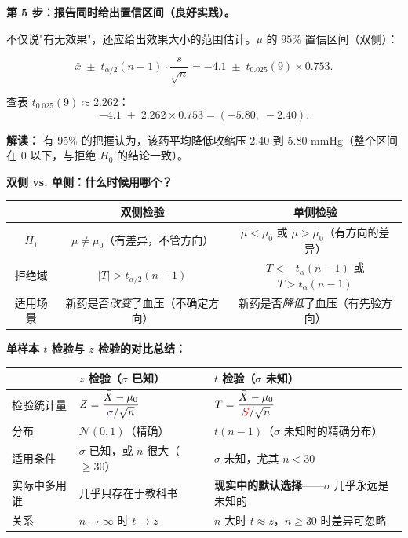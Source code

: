 \textbf{第 5 步：报告同时给出置信区间（良好实践）。}

不仅说"有无效果"，还应给出效果大小的范围估计。$\mu$ 的 $95\%$ 置信区间（双侧）：

\begin{equation}
    \bar{x} \;\pm\; t_{\alpha/2}(n-1) \cdot \frac{s}{\sqrt{n}}
    = -4.1 \;\pm\; t_{0.025}(9) \times 0.753.
\end{equation}

查表 $t_{0.025}(9) \approx 2.262$：
\begin{equation}
    -4.1 \;\pm\; 2.262 \times 0.753 = (-5.80,\; -2.40).
\end{equation}

\textbf{解读：} 有 95\% 的把握认为，该药平均降低收缩压 2.40 到 5.80 mmHg（整个区间在 0 以下，与拒绝 $H_0$ 的结论一致）。

\medskip
\textbf{双侧 vs. 单侧：什么时候用哪个？}

\begin{center}
\renewcommand{\arraystretch}{1.3}
\begin{tabular}{c|c|c}
\toprule
& \textbf{双侧检验} & \textbf{单侧检验} \\
\midrule
$H_1$ & $\mu \neq \mu_0$（有差异，不管方向） & $\mu < \mu_0$ 或 $\mu > \mu_0$（有方向的差异） \\
拒绝域 & $|T| > t_{\alpha/2}(n-1)$ & $T < -t_{\alpha}(n-1)$ 或 $T > t_{\alpha}(n-1)$ \\
适用场景 & 新药是否\emph{改变}了血压（不确定方向） & 新药是否\emph{降低}了血压（有先验方向） \\
\bottomrule
\end{tabular}
\end{center}

\medskip
\textbf{单样本 $t$ 检验与 $z$ 检验的对比总结：}

\begin{center}
\footnotesize
\renewcommand{\arraystretch}{1.4}
\begin{tabular}{p{2.8cm}|p{4.2cm}|p{5cm}}
\toprule
& \textbf{$z$ 检验（$\sigma$ 已知）} & \textbf{$t$ 检验（$\sigma$ 未知）} \\
\midrule
检验统计量 & $Z = \dfrac{\bar{X} - \mu_0}{\textcolor{blue}{\sigma}/\sqrt{n}}$ & $T = \dfrac{\bar{X} - \mu_0}{\textcolor{red}{S}/\sqrt{n}}$ \\
\midrule
分布 & $\mathcal{N}(0,1)$（精确） & $t(n-1)$（$\sigma$ 未知时的精确分布） \\
\midrule
适用条件 & $\sigma$ 已知，或 $n$ 很大（$\ge 30$） & $\sigma$ 未知，尤其 $n < 30$ \\
\midrule
实际中多用谁 & 几乎只存在于教科书 & \textbf{现实中的默认选择}——$\sigma$ 几乎永远是未知的 \\
\midrule
关系 & $n \to \infty$ 时 $t \to z$ & $n$ 大时 $t \approx z$，$n \ge 30$ 时差异可忽略 \\
\bottomrule
\end{tabular}
\end{center}

